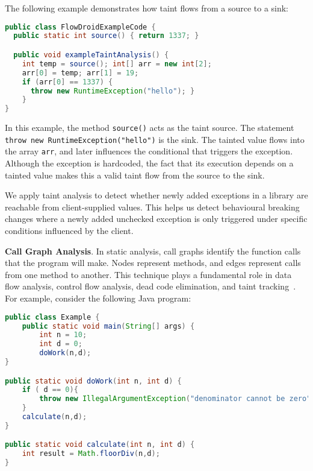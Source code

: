 The following example demonstrates how taint flows from a source to a sink:

\begin{lstlisting}[language=java]
public class FlowDroidExampleCode {
  public static int source() { return 1337; }

  public void exampleTaintAnalysis() {
    int temp = source(); int[] arr = new int[2];
    arr[0] = temp; arr[1] = 19;
    if (arr[0] == 1337) {
      throw new RuntimeException("hello"); }
    }
}
\end{lstlisting}

In this example, the method \texttt{source()} acts as the taint source. The statement \texttt{throw new RuntimeException("hello")} is the sink. The tainted value flows into the array \texttt{arr}, and later influences the conditional that triggers the exception. Although the exception is hardcoded, the fact that its execution depends on a tainted value makes this a valid taint flow from the source to the sink.

We apply taint analysis to detect whether newly added exceptions in a library are reachable from client-supplied values. This helps us detect behavioural breaking changes where a newly added unchecked exception is only triggered under specific conditions influenced by the client.

\textbf{Call Graph Analysis}. In static analysis, call graphs identify the function calls that the
program will make. Nodes represent methods, and edges represent calls from one method to another.
This technique plays a fundamental role in data flow analysis, control flow analysis,
dead code elimination, and taint tracking~\cite{Keshani2024}.
For example, consider the following Java program:
\begin{lstlisting}[language=java]
public class Example {
    public static void main(String[] args) {
        int n = 10;
        int d = 0;
        doWork(n,d);
}

public static void doWork(int n, int d) {
    if ( d == 0){
        throw new IllegalArgumentException("denominator cannot be zero");
    }
    calculate(n,d);
}

public static void calculate(int n, int d) {
    int result = Math.floorDiv(n,d);
}
\end{lstlisting}

